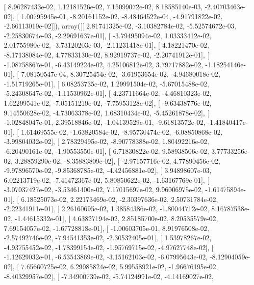 \documentclass{article}
\begin{document}
       [  8.96287433e-02,   1.12181526e-02,   7.15099072e-02,
          8.18585140e-03,  -2.40703463e-02],
       [  1.00795945e-01,  -8.20161152e-02,  -8.48464522e-04,
         -4.91791822e-02,  -2.66113019e-02]]), array([[  2.81741325e-02,  -3.10382784e-02,  -5.52574672e-03,
         -2.25830674e-03,  -2.29691637e-01],
       [ -3.79495094e-02,   1.03333412e-02,   2.01755980e-02,
         -3.73120203e-03,  -2.11231418e-01],
       [  4.18221470e-02,  -8.17138084e-02,   4.77833130e-02,
          8.92919737e-02,  -2.20741912e-01],
       [ -1.08758867e-01,  -6.43149224e-02,   4.25106812e-02,
          3.79717882e-02,  -1.18254146e-01],
       [  7.08150547e-04,   8.30725454e-02,  -3.61953654e-02,
         -4.94680018e-02,  -1.51719265e-01],
       [  6.08253735e-02,   1.29991504e-02,  -5.67015488e-02,
         -5.24308647e-02,  -1.11530962e-01],
       [  4.23711664e-02,  -4.46810323e-02,   1.62299541e-02,
         -7.05151219e-02,  -7.75953128e-02],
       [ -9.63438776e-02,   9.14550628e-02,  -4.73063378e-02,
          1.68310434e-02,  -5.45261878e-02],
       [ -1.02848047e-01,   2.39518846e-02,  -1.04139529e-01,
         -9.61813572e-02,  -1.41840417e-01],
       [  1.61469555e-02,  -1.63820584e-02,  -8.95730474e-02,
         -6.08850868e-02,  -3.99804032e-02],
       [  2.78329495e-02,  -8.90778388e-02,   1.80492216e-02,
         -6.20490161e-02,  -1.90553550e-01],
       [  6.71830822e-02,   9.58938506e-02,   3.77733256e-02,
          3.28859290e-02,  -8.35883809e-02],
       [ -2.97157716e-02,   4.77890456e-02,  -9.97896570e-02,
         -9.85368785e-02,  -4.42456881e-02],
       [  3.94898607e-03,   6.02213719e-02,  -7.41472367e-02,
          5.80850622e-02,  -1.63167769e-01],
       [ -3.07037427e-02,  -3.53461400e-02,   7.17015697e-02,
          9.96006975e-02,  -1.61475894e-01],
       [  6.18525073e-02,   2.22173469e-02,  -2.30397636e-02,
          2.50731784e-02,  -2.22341911e-01],
       [  2.26160695e-02,   1.38584386e-02,  -1.80044712e-02,
          8.16787538e-02,  -1.44615332e-01],
       [  4.63827194e-02,   2.85185700e-02,   8.20535579e-02,
          7.69154057e-02,  -1.67728818e-01],
       [ -1.00603705e-01,   8.91976508e-02,  -2.57492746e-02,
         -7.94541353e-02,  -2.30532405e-01],
       [  1.53978267e-02,  -4.93755452e-02,  -1.78399154e-02,
         -1.95769715e-02,  -4.97627748e-02],
       [ -1.12629032e-01,  -6.53543869e-02,  -3.15162103e-02,
         -6.07995643e-02,  -8.12904059e-02],
       [  7.65660725e-02,   6.29985824e-02,   5.99558921e-02,
         -1.96676195e-02,  -8.40329957e-02],
       [ -7.34900739e-02,  -5.74124991e-02,  -4.14169027e-02,
\end{document}
